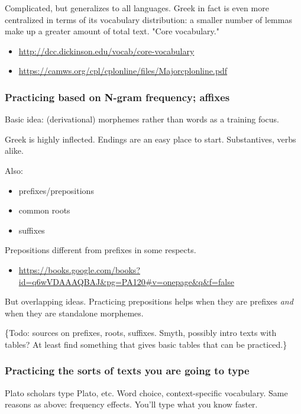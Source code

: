 \documentclass[11pt]{article}
\begin{document}
Complicated, but generalizes to all languages. Greek in fact is even more centralized in terms of its vocabulary distribution: a smaller number of lemmas make up a greater amount of total text. "Core vocabulary."

\begin{itemize}
\item \url{http://dcc.dickinson.edu/vocab/core-vocabulary}
\item \url{https://camws.org/cpl/cplonline/files/Majorcplonline.pdf}
\end{itemize}

\subsubsection{Practicing based on N-gram frequency; affixes}
\label{sec:orgdfd0567}

Basic idea: (derivational) morphemes rather than words as a training focus.

Greek is highly inflected. Endings are an easy place to start. Substantives, verbs alike.

Also:

\begin{itemize}
\item prefixes/prepositions
\item common roots
\item suffixes
\end{itemize}


Prepositions different from prefixes in some respects.

\begin{itemize}
\item \url{https://books.google.com/books?id=q6wVDAAAQBAJ\&pg=PA120\#v=onepage\&q\&f=false}
\end{itemize}

But overlapping ideas. Practicing prepositions helps when they are prefixes \emph{and} when they are standalone morphemes.

\{Todo: sources on prefixes, roots, suffixes. Smyth, possibly intro texts with tables? At least find something that gives basic tables that can be practiced.\}


\subsubsection{Practicing the sorts of texts you are going to type}
\label{sec:org1af81c8}

Plato scholars type Plato, etc. Word choice, context-specific vocabulary. Same reasons as above: frequency effects. You'll type what you know faster.
\end{document}
